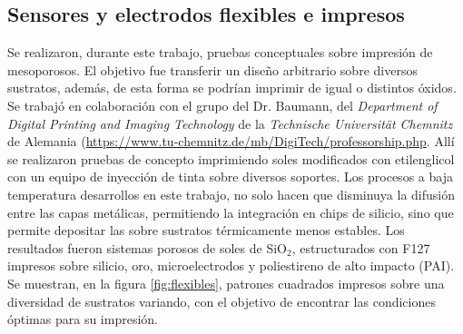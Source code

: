  	\subsection{Sensores y electrodos flexibles e impresos}

 	  Se realizaron, durante este trabajo, pruebas conceptuales sobre impresión de mesoporosos. El objetivo fue transferir un diseño arbitrario sobre diversos sustratos, además, de esta forma se podrían imprimir \pdm\space de igual o distintos óxidos. Se trabajó en colaboración con el grupo del Dr. Baumann, del \textit{Department of Digital Printing and Imaging Technology} de la \textit{Technische Universität Chemnitz} de Alemania (\url{https://www.tu-chemnitz.de/mb/DigiTech/professorship.php}. Allí se realizaron pruebas de concepto imprimiendo soles modificados con etilenglicol con un equipo de inyección de tinta sobre diversos soportes. Los procesos a baja temperatura desarrollos en este trabajo, no solo hacen que disminuya la difusión entre las capas metálicas, permitiendo la integración en chips de silicio, sino que permite depositar las \pdm\space sobre sustratos térmicamente menos estables. Los resultados fueron sistemas porosos de soles de SiO$_2$, estructurados con F127 impresos sobre silicio, oro, microelectrodos y poliestireno de alto impacto (PAI). Se muestran, en la figura \ref{fig:flexibles}, patrones cuadrados impresos sobre una diversidad de sustratos variando, con el objetivo de encontrar las condiciones óptimas para su impresión.

